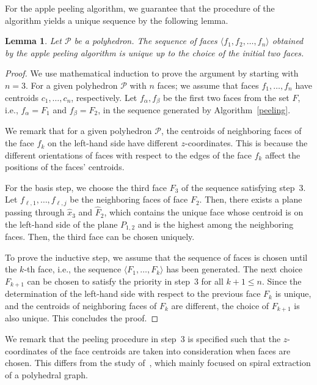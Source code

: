 \documentclass[12pt]{article}
\theoremstyle{plain}
\newtheorem{lemma}[theorem]{Lemma}
\theoremstyle{definition}
\theoremstyle{remark}
\begin{document}
For the apple peeling algorithm, we guarantee that the procedure of the
algorithm yields a unique sequence by the following lemma.

\begin{lemma}
Let $\mathcal{P}$ be a polyhedron.
The sequence of faces $\langle f_1, f_2, \ldots, f_n\rangle$ obtained by
the apple peeling algorithm is unique up to the choice of the initial two
faces.
\end{lemma}

\begin{proof}
We use mathematical induction to prove the argument by starting with $n=3$.
For a given polyhedron $\mathcal{P}$ with $n$ faces; we assume that faces
$f_1, \ldots, f_n$ have centroids $c_1, \ldots, c_n$, respectively.
Let $f_{\alpha}, f_{\beta}$ be the first two faces from the set $F$,
i.e., $f_{\alpha}=F_1$ and $f_{\beta}=F_2$, in the sequence generated by
Algorithm~\ref{peeling}.

We remark that for a given polyhedron $\mathcal{P}$, the centroids of
neighboring faces of the face $f_k$ on the left-hand side have different
$z$-coordinates.
This is because the different orientations of faces with respect to the
edges of the face $f_k$ affect the positions of the faces' centroids.

For the basis step, we choose the third face $F_3$ of the sequence
satisfying step~3.
Let $f_{\ell,1}, \ldots, f_{\ell,j}$ be the neighboring faces of face
$F_2$.
Then, there exists a plane passing through $\hat{x}_3$ and $\hat{F}_2$,
which contains the unique face whose centroid is on the left-hand side of
the plane $P_{1,2}$ and is the highest among the neighboring faces.
Then, the third face can be chosen uniquely.

To prove the inductive step, we assume that the sequence of faces is
chosen until the $k$-th face, i.e., the sequence
$\langle F_1, \ldots, F_k\rangle$ has been generated.
The next choice $F_{k+1}$ can be chosen to satisfy the priority in
step~3 for all $k+1 \leq n$.
Since the determination of the left-hand side with respect to the
previous face $F_k$ is unique, and the centroids of neighboring faces
of $F_k$ are different, the choice of $F_{k+1}$ is also unique.
This concludes the proof.
\end{proof}

We remark that the peeling procedure in step~3 is specified such that
the $z$-coordinates of the face centroids are taken into consideration
when faces are chosen.
This differs from the study of~\cite{WSA2018}, which mainly focused on
spiral extraction of a polyhedral graph.
\end{document}
